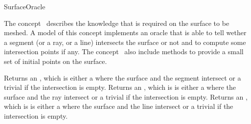 

\begin{ccRefConcept}{SurfaceOracle}


\ccDefinition
  
The concept \ccRefName\ describes the knowledge that is required on the
surface to be meshed. A model of this concept
implements an oracle that is able to tell wether a segment
(or a ray,  or a line) intersects the surface or not
and to compute some intersection
points if any. The concept \ccRefName\ also include methods  to provide
a small set of initial points on the surface.


\ccTypes




{}  %


\ccOperations


{ Returns an ,  which is either a  where
the surface and the segment  intersect or
a trivial  if the intersection is empty.}
\ccGlue
{}
{ Returns an ,  which is is either a  where
the surface and the ray  intersect or
a trivial  if the intersection is empty.}
\ccGlue
{}
{ Returns an ,  which is is either a  where
 the surface and the line  intersect or
a trivial  if the intersection is empty.}


\end{ccRefConcept}
